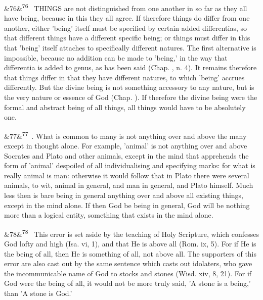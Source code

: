 \documentclass[12pt]{article}
\newcommand{\para}[1][]{\par\noindent\ifx&#1&\else\textsuperscript{\footnotesize #1}~\fi}
\begin{document}
\para[76] THINGS are not distinguished from one another in so far as they all have being, because in this they all agree. If therefore things do differ from one another, either 'being' itself must be specified by certain added differentias, so that different things have a different specific being; or things must differ in this that 'being' itself attaches to specifically different natures. The first alternative is impossible, because no addition can be made to 'being,' in the way that differentia is added to genus, as has been said (Chap. , n. 4). It remains therefore that things differ in that they have different natures, to which 'being' accrues differently. But the divine being is not something accessory to any nature, but is the very nature or essence of God (Chap. ). If therefore the divine being were the formal and abstract being of all things, all things would have to be absolutely one.

\para[77] 4. What is common to many is not anything over and above the many except in thought alone. For example, 'animal' is not anything over and above Socrates and Plato and other animals, except in the mind that apprehends the form of 'animal' despoiled of all individualising and specifying marks: for what is really animal is man: otherwise it would follow that in Plato there were several animals, to wit, animal in general, and man in general, and Plato himself. Much less then is bare being in general anything over and above all existing things, except in the mind alone. If then God be being in general, God will be nothing more than a logical entity, something that exists in the mind alone.

\para[78] This error is set aside by the teaching of Holy Scripture, which confesses God lofty and high (Isa. vi, 1), and that He is above all (Rom. ix, 5). For if He is the being of all, then He is something of all, not above all. The supporters of this error are also cast out by the same sentence which casts out idolaters, who gave the incommunicable name of God to stocks and stones (Wisd. xiv, 8, 21). For if God were the being of all, it would not be more truly said, 'A stone is a being,' than 'A stone is God.'
\end{document}
